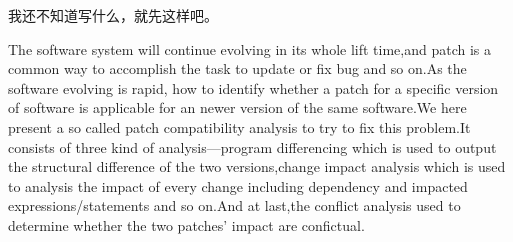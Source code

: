 

\begin{cabstract} 
	我还不知道写什么，就先这样吧。
\end{cabstract}
\begin{eabstract} 
		The software system will continue evolving in its whole lift time,and patch is a common way to accomplish the task to update or fix bug and so on.As the software evolving is rapid, how to identify whether a patch for a specific version of software is applicable for an newer version of the same software.We here present a so called patch compatibility analysis to try to fix this problem.It consists of three kind of analysis—program differencing which is used to output the structural difference of the two versions,change impact analysis which is used to analysis the impact of every change including dependency and impacted expressions/statements and so on.And at last,the conflict analysis used to determine whether the two patches’ impact are confictual.
\end{eabstract}



